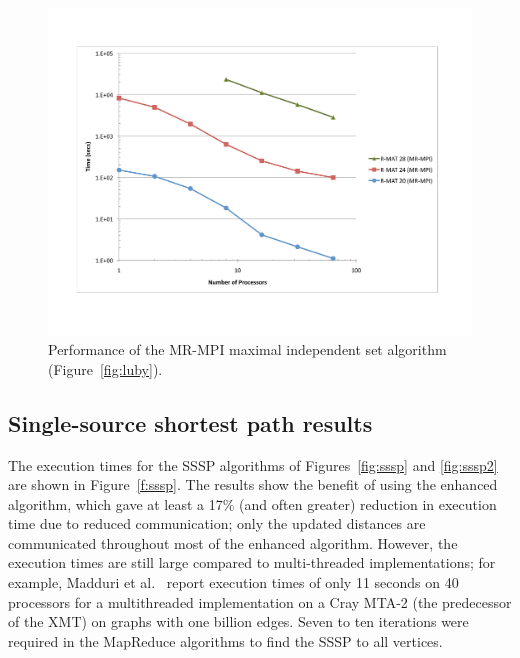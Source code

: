 \begin{figure}[htb]
\includegraphics[width=\textwidth]{fig_luby.pdf}
\caption{Performance of the MR-MPI maximal independent set algorithm (Figure~\ref{fig:luby}).}
\label{f:luby}
\end{figure}

\subsection{Single-source shortest path results}

The execution times for the SSSP algorithms of Figures~\ref{fig:sssp}
and \ref{fig:sssp2} are shown in Figure~\ref{f:sssp}.  The results
show the benefit of using the enhanced algorithm, which gave at least
a 17\% (and often greater) reduction in execution time due to reduced
communication; only the updated distances are communicated throughout
most of the enhanced algorithm.  However, the execution times are
still large compared to multi-threaded implementations; for example,
Madduri et al.~\cite{Madduri07} report execution times of only 11
seconds on 40 processors for a multithreaded implementation on a Cray
MTA-2 (the predecessor of the XMT) on graphs with one billion edges.
Seven to ten iterations were required in the MapReduce algorithms to find
the SSSP to all vertices.

